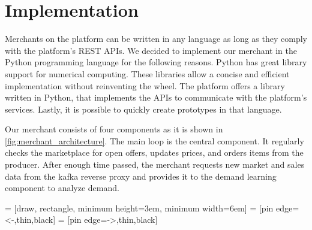 
%

\section{Implementation}
Merchants on the \pricewars platform can be written in any language as long as they comply with the platform's REST APIs.
We decided to implement our merchant in the Python programming language for the following reasons.
Python has great library support for numerical computing.
These libraries allow a concise and efficient implementation without reinventing the wheel.
The \pricewars platform offers a library written in Python, that implements the APIs to communicate with the platform's services.
Lastly, it is possible to quickly create prototypes in that language.

Our merchant consists of four components as it is shown in \cref{fig:merchant_architecture}.
The main loop is the central component.
It regularly checks the marketplace for open offers, updates prices, and orders items from the producer.
After enough time passed, the merchant requests new market and sales data from the kafka reverse proxy and provides it to the demand learning component to analyze demand.

\bgroup
{} = [draw, rectangle, minimum height=3em, minimum width=6em]
 = [pin edge={<-,thin,black}]
 = [pin edge={->,thin,black}]


\renewcommand{\arraystretch}{0.4}

